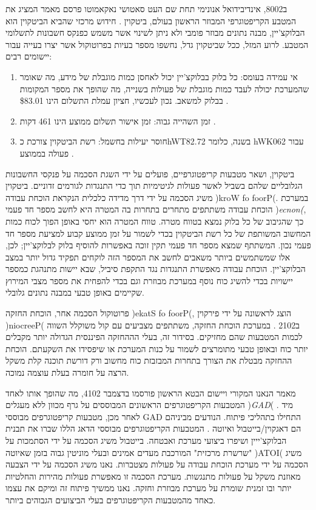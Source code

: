 ב8002, אינדיבידואל אנונימי תחת שם העט סאטושי נאקאמוטו פרסם מאמר המציג את המטבע הקריפטוגרפי המבוזר הראשון בעולם, ביטקוין \cite{Nakamoto_bitcoin:a}. חידוש מרכזי שהביא הביטקוין הוא הבלוקצ'יין, מבנה נתונים מבוזר פומבי ולא ניתן לשינוי אשר משמש כפנקס חשבונות לתשלומי המטבע. לרוע המזל, ככל שביטקוין גדל, נחשפו מספר בעיות בפרוטוקול אשר יצרו בעייה עבור יישומים רבים:

\begin{enumerate}
    \item אי עמידה בעומס: כל בלוק בבלוקצ'יין יכול לאחסן כמות מוגבלת של מידע, מה שאומר שהמערכת יכולה לעבד כמות מוגבלת של פעולות בשנייה, מה שהופך את מספר המקומות בבלוק למשאב. נכון לעכשיו, חציון עמלת התשלום הינו \$83.01 \cite{Bitcoin_med_fee}.
    \item זמן השהייה גבוה: זמן אישור תשלום ממוצע הינו 461 דקות \cite{Bitcoin_avg_confirmation_time}.
    \item חוסר יעילות בחשמל: רשת הביטקוין צורכת כhWT82.72 בשנה, כלומר hWK062 עבור פעולה בממוצע \cite{Bitcoin_energy_index}.
\end{enumerate}

ביטקוין, ושאר מטבעות קריפטוגרפיים, פועלים על ידי השגת הסכמה על פנקסי החשבונות הגלובליים שלהם בשביל לאשר פעולות לגיטימיות תוך כדי התנגדות לגורמים זדוניים. ביטקוין משיג הסכמה על ידי דרך מדידה כלכלית הנקראת הוכחת עבודה )kroW fo foorP(. במערכת הוכחת עבודה משתתפים מתחרים בתחרות בה המטרה היא לחשב מספר חד פעמי )\textit{ecnon(}, כך שהגיבוב של כל בלוק נמצא בטווח מטרה. טווח המטרה הוא יחסי באופן הפוך לכוח כמות המחשוב המשותפת של כל רשת הביטקוין בכדי לשמור על זמן ממוצע קבוע למציעת מספר חד פעמי נכון. המשתתף שמצא מספר חד פעמי תקין זוכה באפשרות להוסיף בלוק לבלוקצ'יין; לכן, אלו שמשתמשים ביותר משאבים לחשב את המספר הזה לוקחים תפקיד גדול יותר במצב הבלוקצ'יין. הוכחת עבודה מאפשרת התנגדות נגד התקפת סיביל, שבא יישות מתנהגת כמספר יישויות בכדי להשיג כוח נוסף במערכת מבוזרת וגם בכדי להפחית את מספר מצבי המירוץ שקיימים באופן טבעי במבנה נתונים גלובלי. 

פרוטוקול הסכמה אחר, הוכחת החזקה  )ekatS fo foorP(, הוצג לראשונה על ידי פירקוין )niocreeP( ב2102 \cite{King_peercoin}. במערכת הוכחת החזקה, משתתפים מצביעים עם קול משוקלל השווה לכמות המטבעות שהם מחזיקים. בסידור זה, בעלי הההחזקה הפיננסית הגדולה יותר מקבלים יותר כוח ובאופן טבעי מתומרצים לשמור על כנות המערכת או שיפסידו את השקעתם. הוכחת ההחזקה מבטלת את הצורך בתחרות המבזבזת כוח מחשוב ורק דורשת תוכנה קלת משקל הרצה על חומרה בעלת עוצמה נמוכה.
    
מאמר הנאנו המקורי ויישום הבטא הראשון פורסמו בדצמבר 4102, מה שהופך אותו לאחד המטבעות הקריפטוגרפים הראשונים המבוססים על גרף מכוון ללא מעגלים )\textit{GAD}( \cite{Colin_original_raiblocks}. מיד לאחר מכן, מטבעות קריפטוגרפים מבוססי GAD התחילו בתהליכי פיתוח. הנודעים מביניהם הם דאגקוין/בייטבול ואיוטה \cite{Ribero_dagcoin:a} \cite{Popov_tangle:a}. המטבעות הקריפטוגרפים מבוססי הדאג הללו שברו את תבנית הבלוקצ'ייין ושיפרו ביצועי מערכת ואבטחה. בייטבול משיג הסכמה על ידי הסתמכות על "שרשרת מרכזית" המורכבת מעדים אמינים ובעלי מוניטין גבוה בזמן שאיוטה )ATOI( משיג הסכמה על ידי מערכת הוכחת עבודה על פעולות מצטברות. נאנו משיג הסכמה על ידי הצבעה מאוזנת משקל על פעולות מתנגשות. מערכת הסכמה זו מאפשרת פעולות מהירות והחלטיות יותר ובו זמנית שומרת על מערכת מבוזרת וחזקה. נאנו ממשיך פיתוח זה ומיקם את עצמו כאחד מהמטבעות הקריפטוגרפים בעלי הביצועים הגבוהים ביותר.